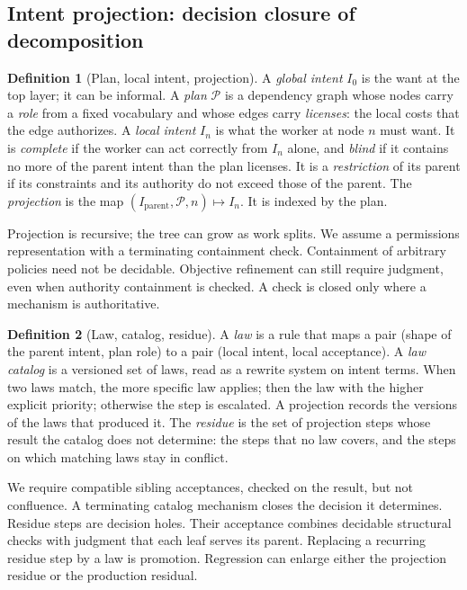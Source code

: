\documentclass[11pt]{article}
\theoremstyle{definition}
\newtheorem{definition}{Definition}
\theoremstyle{remark}
\begin{document}
\subsection{Intent projection: decision closure of decomposition}\label{sec:projection}
\begin{definition}[Plan, local intent, projection]\label{def:projection}
A \emph{global intent} $I_0$ is the want at the top layer; it can be informal. A \emph{plan} $\mathcal{P}$
is a dependency graph whose nodes carry a \emph{role} from a fixed vocabulary and whose edges carry
\emph{licenses}: the local costs that the edge authorizes. A \emph{local intent} $I_n$ is what the
worker at node $n$ must want. It is \emph{complete} if the worker can act correctly from $I_n$ alone,
and \emph{blind} if it contains no more of the parent intent than the plan licenses. It is a
\emph{restriction} of its parent if its constraints and its authority do not exceed those of the
parent. The \emph{projection} is the map $(I_{\mathrm{parent}},\mathcal{P},n)\mapsto I_n$. It is
indexed by the plan.
\end{definition}
Projection is recursive; the tree can grow as work splits.
We assume a permissions representation with a terminating containment check.
Containment of arbitrary policies need not be decidable.
Objective refinement can still require judgment, even when authority containment is checked.
A check is closed only where a mechanism is authoritative.

\begin{definition}[Law, catalog, residue]\label{def:law}
A \emph{law} is a rule that maps a pair (shape of the parent intent, plan role) to a pair (local
intent, local acceptance). A \emph{law catalog} is a versioned set of laws, read as a rewrite system
on intent terms. When two laws match, the more specific law applies; then the law with the higher
explicit priority; otherwise the step is escalated. A projection records the versions of the laws
that produced it. The \emph{residue} is the set of projection steps whose result the catalog does not
determine: the steps that no law covers, and the steps on which matching laws stay in conflict.
\end{definition}
We require compatible sibling acceptances, checked on the result, but not confluence.
A terminating catalog mechanism closes the decision it determines.
Residue steps are decision holes. Their acceptance combines decidable structural checks with
judgment that each leaf serves its parent. Replacing a recurring residue step by a law is promotion.
Regression can enlarge either the projection residue or the production residual.
\end{document}

